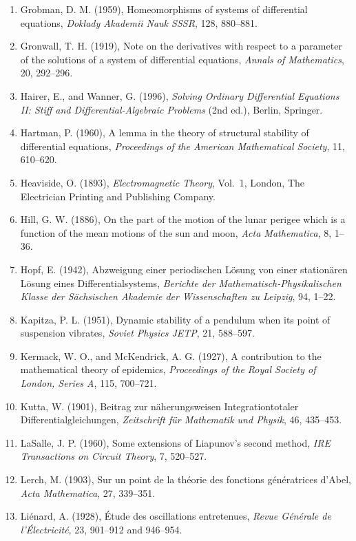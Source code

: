 \documentclass[11pt,a4paper]{article}
\numberwithin{equation}{section}
\theoremstyle{definition}
\begin{document}
\begin{enumerate}
{angewandte Mathematik}, 66, 121--160.
\item Grobman, D. M. (1959), Homeomorphisms of systems of differential equations, \emph{Doklady Akademii Nauk SSSR}, 128, 880--881.
\item Gronwall, T. H. (1919), Note on the derivatives with respect to a parameter of the solutions of a system of differential equations,
\emph{Annals of Mathematics}, 20, 292--296.
\item Hairer, E., and Wanner, G. (1996), \emph{Solving Ordinary Differential Equations II: Stiff and Differential-Algebraic Problems} (2nd ed.), Berlin,
Springer.
\item Hartman, P. (1960), A lemma in the theory of structural stability of differential equations, \emph{Proceedings of the American Mathematical Society},
11, 610--620.
\item Heaviside, O. (1893), \emph{Electromagnetic Theory}, Vol.~1, London, The Electrician Printing and Publishing Company.
\item Hill, G. W. (1886), On the part of the motion of the lunar perigee which is a function of the mean motions of the sun and moon, \emph{Acta
Mathematica}, 8, 1--36.
\item Hopf, E. (1942), Abzweigung einer periodischen L\"osung von einer station\"aren L\"osung eines Differentialsystems, \emph{Berichte der
Mathematisch-Physikalischen Klasse der S\"achsischen Akademie der Wissenschaften zu Leipzig}, 94, 1--22.
\item Kapitza, P. L. (1951), Dynamic stability of a pendulum when its point of suspension vibrates, \emph{Soviet Physics JETP}, 21, 588--597.
\item Kermack, W. O., and McKendrick, A. G. (1927), A contribution to the mathematical theory of epidemics, \emph{Proceedings of the Royal Society of
London, Series A}, 115, 700--721.
\item Kutta, W. (1901), Beitrag zur n\"aherungsweisen Integration\newline totaler Differentialgleichungen,
\emph{Zeitschrift f\"ur Mathematik und Physik}, 46, 435--453.
\item LaSalle, J. P. (1960), Some extensions of Liapunov's second method, \emph{IRE Transactions on Circuit Theory}, 7, 520--527.
\item Lerch, M. (1903), Sur un point de la th\'eorie des fonctions g\'en\'eratrices d'Abel, \emph{Acta Mathematica}, 27, 339--351.
\item Li\'enard, A. (1928), \'Etude des oscillations entretenues, \emph{Revue G\'en\'erale de l'\'Electricit\'e}, 23, 901--912 and 946--954.

\end{enumerate}
\end{document}
